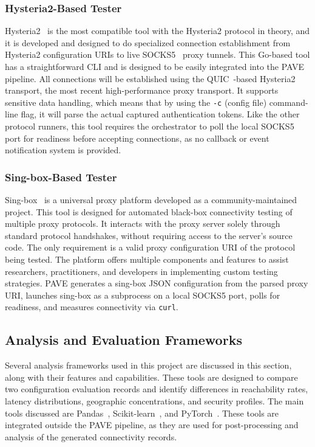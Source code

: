 \documentclass[10pt,conference]{IEEEtran}
\begin{document}
\subsubsection{Hysteria2-Based Tester}
Hysteria2~\cite{hysteria2_proto} is the most compatible tool with the Hysteria2 protocol in theory, and it is developed and designed to do specialized connection establishment from Hysteria2 configuration URIs to live SOCKS5~\cite{rfc1928} proxy tunnels.
This Go-based tool has a straightforward CLI and is designed to be easily integrated into the PAVE pipeline.
All connections will be established using the QUIC~\cite{rfc9000}-based Hysteria2 transport, the most recent high-performance proxy transport.
It supports sensitive data handling, which means that by using the \texttt{-c} (config file) command-line flag, it will parse the actual captured authentication tokens.
Like the other protocol runners, this tool requires the orchestrator to poll the local SOCKS5 port for readiness before accepting connections, as no callback or event notification system is provided.

\subsubsection{Sing-box-Based Tester}
Sing-box~\cite{singbox} is a universal proxy platform developed as a community-maintained project.
This tool is designed for automated black-box connectivity testing of multiple proxy protocols.
It interacts with the proxy server solely through standard protocol handshakes, without requiring access to the server's source code.
The only requirement is a valid proxy configuration URI of the protocol being tested.
The platform offers multiple components and features to assist researchers, practitioners, and developers in implementing custom testing strategies.
PAVE generates a sing-box JSON configuration from the parsed proxy URI, launches sing-box as a subprocess on a local SOCKS5 port, polls for readiness, and measures connectivity via \texttt{curl}.

\subsection{Analysis and Evaluation Frameworks}
Several analysis frameworks used in this project are discussed in this section, along with their features and capabilities.
These tools are designed to compare two configuration evaluation records and identify differences in reachability rates, latency distributions, geographic concentrations, and security profiles.
The main tools discussed are Pandas~\cite{pandas}, Scikit-learn~\cite{scikit_learn}, and PyTorch~\cite{pytorch}.
These tools are integrated outside the PAVE pipeline, as they are used for post-processing and analysis of the generated connectivity records.
\end{document}
